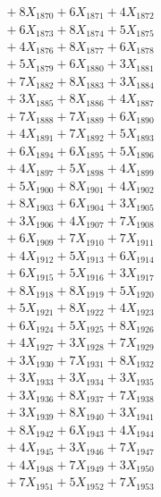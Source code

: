 \documentclass[a4paper,10pt]{article}
\begin{document}
{\begin{align}
&\;  + 8 X_{1870} + 6 X_{1871} + 4 X_{1872} \\[0.3ex]
&\;  + 6 X_{1873} + 8 X_{1874} + 5 X_{1875} \\[0.3ex]
&\;  + 4 X_{1876} + 8 X_{1877} + 6 X_{1878} \\[0.3ex]
&\;  + 5 X_{1879} + 6 X_{1880} + 3 X_{1881} \\[0.3ex]
&\;  + 7 X_{1882} + 8 X_{1883} + 3 X_{1884} \\[0.3ex]
&\;  + 3 X_{1885} + 8 X_{1886} + 4 X_{1887} \\[0.3ex]
&\;  + 7 X_{1888} + 7 X_{1889} + 6 X_{1890} \\[0.3ex]
&\;  + 4 X_{1891} + 7 X_{1892} + 5 X_{1893} \\[0.3ex]
&\;  + 6 X_{1894} + 6 X_{1895} + 5 X_{1896} \\[0.3ex]
&\;  + 4 X_{1897} + 5 X_{1898} + 4 X_{1899} \\[0.5ex]\allowbreak
&\;  + 5 X_{1900} + 8 X_{1901} + 4 X_{1902} \\[0.3ex]
&\;  + 8 X_{1903} + 6 X_{1904} + 3 X_{1905} \\[0.3ex]
&\;  + 3 X_{1906} + 4 X_{1907} + 7 X_{1908} \\[0.3ex]
&\;  + 6 X_{1909} + 7 X_{1910} + 7 X_{1911} \\[0.3ex]
&\;  + 4 X_{1912} + 5 X_{1913} + 6 X_{1914} \\[0.3ex]
&\;  + 6 X_{1915} + 5 X_{1916} + 3 X_{1917} \\[0.3ex]
&\;  + 8 X_{1918} + 8 X_{1919} + 5 X_{1920} \\[0.3ex]
&\;  + 5 X_{1921} + 8 X_{1922} + 4 X_{1923} \\[0.3ex]
&\;  + 6 X_{1924} + 5 X_{1925} + 8 X_{1926} \\[0.3ex]
&\;  + 4 X_{1927} + 3 X_{1928} + 7 X_{1929} \\[0.5ex]\allowbreak
&\;  + 3 X_{1930} + 7 X_{1931} + 8 X_{1932} \\[0.3ex]
&\;  + 3 X_{1933} + 3 X_{1934} + 3 X_{1935} \\[0.3ex]
&\;  + 3 X_{1936} + 8 X_{1937} + 7 X_{1938} \\[0.3ex]
&\;  + 3 X_{1939} + 8 X_{1940} + 3 X_{1941} \\[0.3ex]
&\;  + 8 X_{1942} + 6 X_{1943} + 4 X_{1944} \\[0.3ex]
&\;  + 4 X_{1945} + 3 X_{1946} + 7 X_{1947} \\[0.3ex]
&\;  + 4 X_{1948} + 7 X_{1949} + 3 X_{1950} \\[0.3ex]
&\;  + 7 X_{1951} + 5 X_{1952} + 7 X_{1953} \\[0.3ex]

\end{align}}
\end{document}
